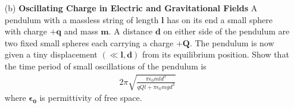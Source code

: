 \documentclass[]{article}
\newcommand{\bd}{\textbf}
\begin{document}
{\begin{enumerate}
\begin{enumerate}
				\item[ii.] Show that in the limit $\bm{x \ll L}$, the piston oscillates harmonically and find its angular frequency of small oscillations.
					\begin{equation*}
						\begin{split}
							\frac{d^2 x}{dt^2} &= \alpha \left[ (L + x)^{-\gamma} - (L - x)^{-\gamma} \right] = \alpha \left[ \frac{1}{L^{\gamma}}\left( 1 + \frac{x}{L} \right)^{-\gamma} - \frac{1}{L^{\gamma}}\left( 1 - \frac{x}{L} \right)^{-\gamma} \right] = \frac{\alpha}{L^{\gamma}} \left[ (1 - \frac{\gamma x}{L}) - (1 + \frac{\gamma x}{L}) \right] \\
							&= -\frac{2\alpha \gamma x}{L^{\gamma} L} = -\frac{p_0 A L^{\gamma}}{m} \frac{2\gamma x}{L^{\gamma} L} = -\frac{2p_0 A \gamma x}{mL} \\
						\end{split}
					\end{equation*}
					\begin{equation*}
						\begin{split}
							\frac{d^2 x}{dt^2} + \left( \frac{2p_0 A \gamma}{mL} \right)x &= 0 \\
							\omega &= \sqrt{\frac{mL}{2p_0 A \gamma}} \\
						\end{split}
					\end{equation*}
			\end{enumerate}
		\item[(b)] \bd{Oscillating Charge in Electric and Gravitational Fields} A pendulum with a massless string of length $\bm{l}$ has on its end a small sphere with charge $\bm{+q}$ and mass $\bm{m}$. A distance $\bm{d}$ on either side of the pendulum are two fixed small spheres each carrying a charge $\bm{+Q}$. The pendulum is now given a tiny displacement $\bm{(\ll l,d)}$ from its equilibrium position. Show that the time period of small oscillations of the pendulum is
			\begin{equation*}
				\begin{split}
					2 \pi \sqrt{ \frac{ \pi \epsilon_0 m l d^3 }{ qQl + \pi \epsilon_0 m g d^3 } }
				\end{split}
			\end{equation*}
		where $\bm{\epsilon_0}$ is permittivity of free space.

\end{enumerate}}
\end{document}
